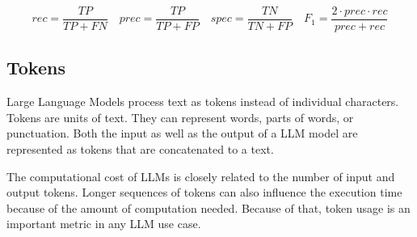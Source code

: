 \begin{equation*}
    rec = \frac{TP}{TP + FN} \quad  prec = \frac{TP}{TP + FP} \quad spec = \frac{TN}{TN + FP} \quad F_1=\frac{2\cdot prec \cdot rec}{prec + rec}
\end{equation*}

\subsection{Tokens}

Large Language Models process text as tokens instead of individual characters. 
Tokens are units of text. 
They can represent words, parts of words, or punctuation.
Both the input as well as the output of a LLM model are represented as tokens that are concatenated to a text.

\vspace{0.25cm}
\noindent The computational cost of LLMs is closely related to the number of input and output tokens. 
Longer sequences of tokens can also influence the execution time because of the amount of computation needed.
Because of that, token usage is an important metric in any LLM use case.


